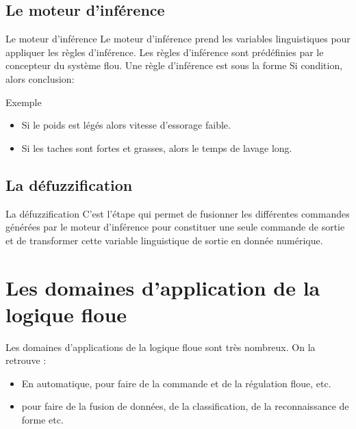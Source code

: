 \documentclass[aspectratio=169,professionalfonts, 12pt]{beamer}
\begin{document}
\subsection{Le moteur d'inférence}
\begin{frame}{Le moteur d'inférence}
  Le moteur d’inférence prend les variables linguistiques pour
  appliquer les règles d’inférence. Les règles d’inférence sont 
  prédéfinies par le concepteur du système flou. \newline
  Une règle d'inférence est sous la forme Si condition, alors conclusion:
  \begin{block}{Exemple}
    \begin{itemize}
      \item Si le poids est légés alors vitesse d’essorage faible.
      \item Si les taches sont fortes et grasses, alors le temps de lavage long.
    \end{itemize}
  \end{block}
\end{frame}
\subsection{La défuzzification}
\begin{frame}{La défuzzification}
  C’est l’étape qui permet de fusionner les différentes commandes générées par
  le moteur d'inférence pour constituer une seule commande de sortie et de
  transformer cette variable linguistique de sortie en donnée numérique.
\end{frame}
\section{Les domaines d’application de la logique floue}
\begin{frame}
  Les domaines d'applications de la logique floue sont très nombreux. On la retrouve :
  \begin{itemize}
    \item En automatique, pour faire de la commande et de la régulation floue, etc.
    \item pour faire de la fusion de données, de la classification, de la reconnaissance de forme etc.
  \end{itemize}
\end{frame}
\end{document}
